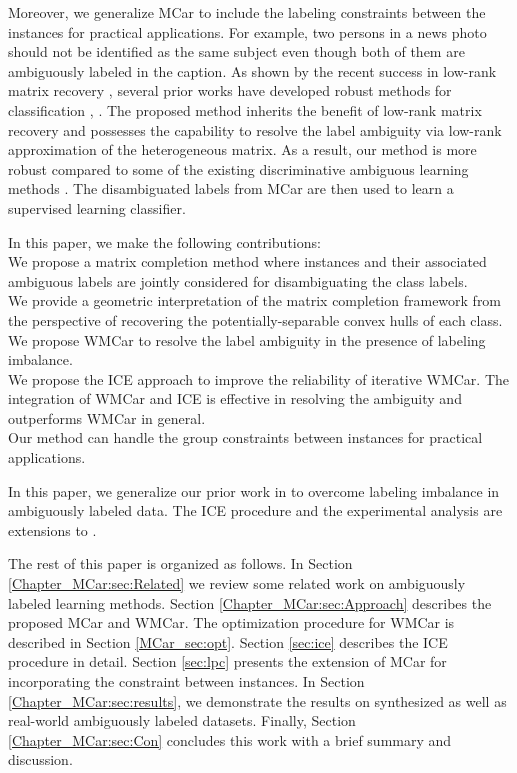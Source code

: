 \documentclass[10pt,journal,compsoc]{IEEEtran}
\begin{document}
Moreover, we generalize MCar to include the labeling constraints between the instances for practical applications. For example, two persons in a news photo should not be identified as the same subject even though both of them are ambiguously labeled in the caption.
As shown by the recent success in low-rank matrix recovery \cite{Candes2011}, several prior works have developed robust methods for classification  \cite{Chen2012}, \cite{Huang2012}. The proposed method inherits the benefit of low-rank matrix recovery and possesses the capability to resolve the label ambiguity via low-rank approximation of the heterogeneous matrix.  As a result, our method is more robust compared to some of the existing discriminative ambiguous learning methods \cite{Cour2009,Luo2010}.  The disambiguated labels from MCar are then used to learn a supervised learning classifier.

In this paper, we make the following contributions:\\
 We propose a matrix completion method where instances and their associated ambiguous labels are jointly considered for disambiguating the class labels.\\
 We provide a geometric interpretation of the matrix completion framework from the perspective of recovering the potentially-separable convex hulls of each class. \\
  We propose WMCar to resolve the label ambiguity in the presence of labeling imbalance.\\
 We propose the ICE approach to improve the reliability of iterative WMCar. The integration of WMCar and ICE is effective in resolving the ambiguity and outperforms WMCar in general. \\
 Our method can handle the group constraints between instances for practical applications.


In this paper, we generalize our prior work in \cite{Chen2015mcf} to overcome labeling imbalance in ambiguously labeled data. The ICE procedure and the experimental analysis are extensions to \cite{Chen2015mcf}.


The rest of this paper is organized as follows. In Section
\ref{Chapter_MCar:sec:Related} we review some related work on ambiguously labeled learning methods.  Section \ref{Chapter_MCar:sec:Approach} describes the proposed MCar and WMCar. The optimization procedure for WMCar is described in Section \ref{MCar_sec:opt}. Section \ref{sec:ice} describes the ICE procedure in detail.  Section \ref{sec:lpc} presents the extension of MCar for incorporating the constraint between instances. In Section \ref{Chapter_MCar:sec:results}, we demonstrate the results on synthesized as well as real-world ambiguously labeled datasets. Finally, Section \ref{Chapter_MCar:sec:Con} concludes this work with a brief summary and discussion.
\end{document}
